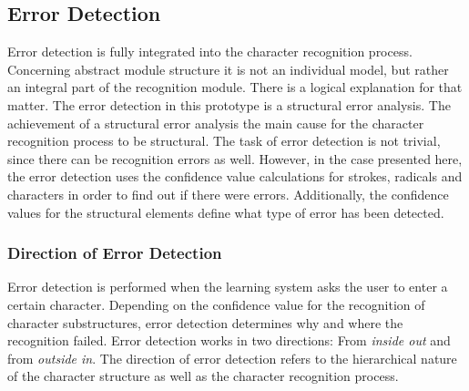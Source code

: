 \subsection{Error Detection}
\label{sec:hwre:errordetection}





Error detection is fully integrated into the character recognition process.
Concerning abstract module structure it is not an individual model, but rather
an integral part of the recognition module.
There is a logical explanation for that matter. The error detection in this 
prototype is a structural error analysis. The achievement of a structural error 
analysis the main cause for the character recognition process to be structural.
The task of error detection is not trivial, since there can be recognition errors
as well. However, in the case presented here, the error detection uses the
confidence value calculations for strokes, radicals and characters in order
to find out if there were errors. Additionally, the confidence values
for the structural elements define what type of error has been detected.

\subsubsection{Direction of Error Detection}
\label{sec:hwre:directionoferrordetection}

Error detection is performed when the learning system asks the user to enter a
certain character. Depending on the confidence value for the recognition of 
character substructures, error detection determines why and where the 
recognition failed. Error detection works in two directions:
From \emph{inside out} and from \emph{outside in}. 
The direction of error detection refers to the hierarchical nature of the 
character structure as well as the character recognition process.

